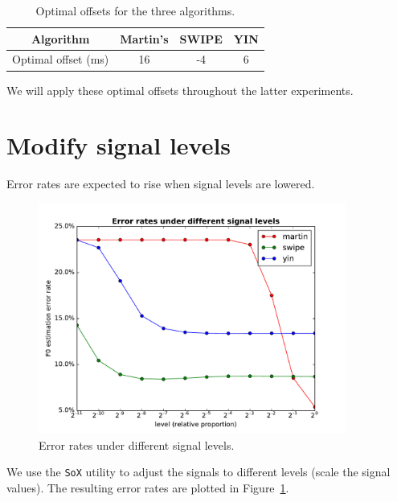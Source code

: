 \documentclass[11pt,a4paper]{report}
\begin{document}
\begin{table}[htbp]
  \centering
  \begin{tabular}{cccc}
  	\toprule
  	             Algorithm              & Martin's & SWIPE & YIN \\
  	\midrule
  	Optimal offset (\si{\milli\second}) &    16    &  -4   &  6  \\
  	\bottomrule
  \end{tabular}
  \caption{Optimal offsets for the three algorithms.} \label{tab:offsets}
\end{table}

We will apply these optimal offsets throughout the latter experiments.

\newpage

\section{Modify signal levels}

Error rates are expected to rise when signal levels are lowered.

\begin{figure}[htbp]
  \centering
  \includegraphics[width=0.9\textwidth]{error_rates_vs_signal_levels.pdf}
  \caption{Error rates under different signal levels.} \label{fig:levels}
\end{figure}

We use the \texttt{SoX} utility to adjust the signals to different levels (scale the signal values).
The resulting error rates are plotted in Figure~\ref{fig:levels}.
\end{document}
